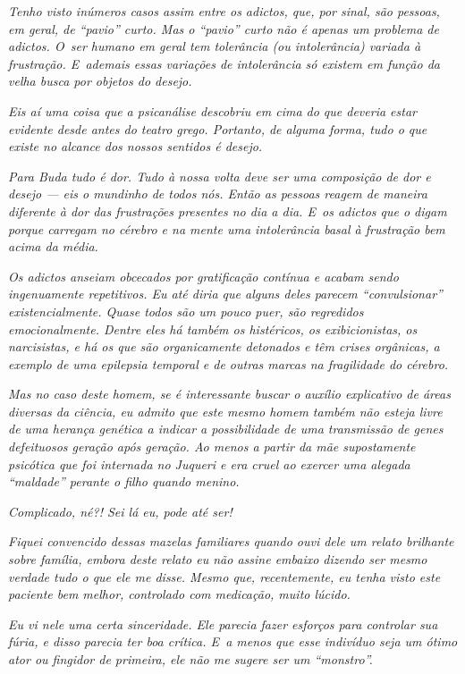 \emph{Tenho visto inúmeros casos assim entre os adictos, que, por sinal,
são pessoas, em geral, de ``pavio'' curto. Mas o ``pavio'' curto não é
apenas um problema de adictos. O~ser humano em geral tem tolerância (ou
intolerância) variada à frustração. E~ademais essas variações de
intolerância só existem em função da velha busca por objetos do
desejo.}~

\emph{Eis aí uma coisa que a psicanálise descobriu em cima do que
deveria estar evidente desde antes do teatro grego. Portanto, de alguma
forma, tudo o que existe no alcance dos nossos sentidos é desejo.}~

\emph{Para Buda tudo é dor. Tudo à nossa volta deve ser uma composição
de dor e desejo --- eis o mundinho de todos nós. Então as pessoas reagem
de maneira diferente à dor das frustrações presentes no dia a dia. E~os
adictos que o digam porque carregam no cérebro e na mente uma
intolerância basal à frustração bem acima da média.}~

\emph{Os adictos anseiam obcecados por gratificação contínua e acabam
sendo ingenuamente repetitivos. Eu até diria que alguns deles parecem
``convulsionar'' existencialmente. Quase todos são um pouco puer, são
regredidos emocionalmente. Dentre eles há também os histéricos, os
exibicionistas, os narcisistas, e há os que são organicamente detonados
e têm crises orgânicas, a exemplo de uma epilepsia temporal e de outras
marcas na fragilidade do cérebro.}~

\emph{Mas no caso deste homem, se é interessante buscar o auxílio
explicativo de áreas diversas da ciência, eu admito que este mesmo homem
também não esteja livre de uma herança genética a indicar a
possibilidade de uma transmissão de genes defeituosos geração após
geração. Ao menos a partir da mãe supostamente psicótica que foi
internada no Juqueri e era cruel ao exercer uma alegada ``maldade''
perante o filho quando menino.}~

\emph{Complicado, né?! Sei lá eu, pode até ser!}

\emph{Fiquei convencido dessas mazelas familiares quando ouvi dele um
relato brilhante sobre família, embora deste relato eu não assine
embaixo dizendo ser mesmo verdade tudo o que ele me disse. Mesmo que,
recentemente, eu tenha visto este paciente bem melhor, controlado com
medicação, muito lúcido.}~

\emph{Eu vi nele uma certa sinceridade. Ele parecia fazer esforços para
controlar sua fúria, e disso parecia ter boa crítica. E~a menos que esse
indivíduo seja um ótimo ator ou fingidor de primeira, ele não me sugere
ser um ``monstro''.}~

